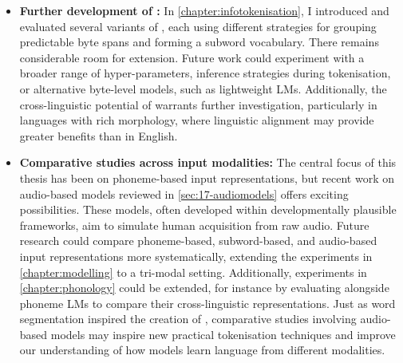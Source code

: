 \begin{itemize}
    \item \textbf{Further development of \bytespan :} In \cref{chapter:infotokenisation}, I introduced and evaluated several variants of \bytespan, each using different strategies for grouping predictable byte spans and forming a subword vocabulary. There remains considerable room for extension. Future work could experiment with a broader range of hyper-parameters, inference strategies during tokenisation, or alternative byte-level models, such as lightweight \ngram LMs. Additionally, the cross-linguistic potential of \bytespan warrants further investigation, particularly in languages with rich morphology, where linguistic alignment may provide greater benefits than in English.
    \item \textbf{Comparative studies across input modalities:}
    The central focus of this thesis has been on phoneme-based input representations, but recent work on audio-based models reviewed in \cref{sec:17-audiomodels} offers exciting possibilities. These models, often developed within developmentally plausible frameworks, aim to simulate human acquisition from raw audio. Future research could compare phoneme-based, subword-based, and audio-based input representations more systematically, extending the experiments in \cref{chapter:modelling} to a tri-modal setting. Additionally, experiments in \cref{chapter:phonology} could be extended, for instance by evaluating \stela alongside phoneme LMs to compare their cross-linguistic representations. Just as word segmentation inspired the creation of \bytespan, comparative studies involving audio-based models may inspire new practical tokenisation techniques and improve our understanding of how models learn language from different modalities.
\end{itemize}

